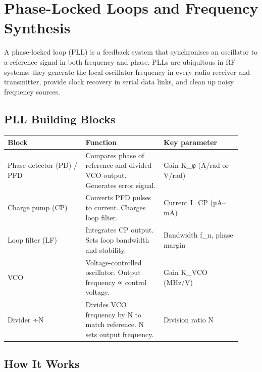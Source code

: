 \section{Phase-Locked Loops and Frequency Synthesis}\label{sec:wiki_pll}



A phase-locked loop (PLL) is a feedback system that synchronises an oscillator to a reference signal in both frequency and phase. PLLs are ubiquitous in RF systems: they generate the local oscillator frequency in every radio receiver and transmitter, provide clock recovery in serial data links, and clean up noisy frequency sources.

      

\subsection{PLL Building Blocks}

      
        
        
        
        
        
        
      

{\small\begin{longtable}{>{\raggedright\arraybackslash}p{0.307\linewidth}>{\raggedright\arraybackslash}p{0.307\linewidth}>{\raggedright\arraybackslash}p{0.307\linewidth}}
\hline
\textbf{Block} & \textbf{Function} & \textbf{Key parameter} \\
\hline
Phase detector (PD) / PFD & Compares phase of reference and divided VCO output. Generates error signal. & Gain K\_φ (A/rad or V/rad) \\
Charge pump (CP) & Converts PFD pulses to current. Charges loop filter. & Current I\_CP (µA–mA) \\
Loop filter (LF) & Integrates CP output. Sets loop bandwidth and stability. & Bandwidth f\_n, phase margin \\
VCO & Voltage-controlled oscillator. Output frequency ∝ control voltage. & Gain K\_VCO (MHz/V) \\
Divider ÷N & Divides VCO frequency by N to match reference. N sets output frequency. & Division ratio N \\
\hline
\end{longtable}}

      

\subsection{How It Works}

